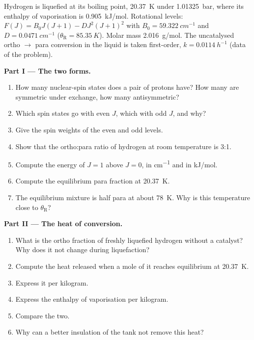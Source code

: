 \begin{problem}
\label{pb:b3:statistical-thermo-applied:1}
Hydrogen is liquefied at its boiling point, \qty{20.37}{K} under \qty{1.01325}{bar}, where its
enthalpy of vaporisation is \qty{0.905}{kJ/mol}. Rotational levels: $F(J) = B_0J(J+1) -
D J^2(J+1)^2$ with $B_0 = \qty{59.322}{cm^{-1}}$ and $D = \qty{0.0471}{cm^{-1}}$ ($\theta_{\mathrm R} = \qty{85.35}{K}$).
Molar mass \qty{2.016}{g/mol}. The uncatalysed ortho $\to$ para conversion in the liquid
is taken first-order, $k = \qty{0.0114}{h^{-1}}$ (data of the problem).

\medskip\noindent\textbf{Part I --- The two forms.}
\begin{enumerate}
  \item How many nuclear-spin states does a pair of protons have? How many are
        symmetric under exchange, how many antisymmetric?
  \item Which spin states go with even $J$, which with odd $J$, and why?
  \item Give the spin weights of the even and odd levels.
  \item Show that the ortho:para ratio of hydrogen at room temperature is 3:1.
  \item Compute the energy of $J = 1$ above $J = 0$, in \unit{cm^{-1}} and in
        \unit{kJ/mol}.
  \item Compute the equilibrium para fraction at \qty{20.37}{K}.
  \item The equilibrium mixture is half para at about \qty{78}{K}. Why is this
        temperature close to $\theta_{\mathrm R}$?
\end{enumerate}

\medskip\noindent\textbf{Part II --- The heat of conversion.}
\begin{enumerate}[resume]
  \item What is the ortho fraction of freshly liquefied hydrogen without a
        catalyst? Why does it not change during liquefaction?
  \item Compute the heat released when a mole of it reaches equilibrium at
        \qty{20.37}{K}.
  \item Express it per kilogram.
  \item Express the enthalpy of vaporisation per kilogram.
  \item Compare the two.
  \item Why can a better insulation of the tank not remove this heat?
\end{enumerate}


\end{problem}
